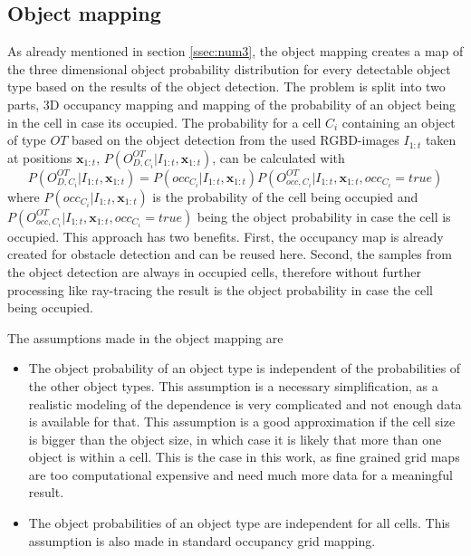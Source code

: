 \subsection{Object mapping}

As already mentioned in section \ref{ssec:num3}, the object mapping creates a map of the three dimensional object probability distribution for every detectable object type based on the results of the object detection. The problem is split into two parts, 3D occupancy mapping and mapping of the probability of an object being in the cell in case its occupied. The probability for a cell $C_i$ containing an object of type $OT$ based on the object detection from the used RGBD-images $I_{1:t}$ taken at positions $\mathbf{x}_{1:t}$, $P(O_{D,C_{i}}^{OT}|I_{1:t},\mathbf{x}_{1:t})$, can be calculated with
\begin{equation}
 P(O_{D,C_i}^{OT}|I_{1:t},\mathbf{x}_{1:t})=P(occ_{C_i}|I_{1:t},\mathbf{x}_{1:t})P(O_{occ,C_i}^{OT}|I_{1:t}, \mathbf{x}_{1:t},occ_{C_i}=true)
\end{equation}
where $P(occ_{C_i}|I_{1:t},\mathbf{x}_{1:t})$ is the probability of the cell being occupied and $P(O_{occ,C_i}^{OT}|I_{1:t}, \mathbf{x}_{1:t},occ_{C_i}=true)$ being the object probability in case the cell is occupied. This approach has two benefits. First, the occupancy map is already created for obstacle detection and can be reused here. Second, the samples from the object detection are always in occupied cells, therefore without further processing like ray-tracing the result is the object probability in case the cell being occupied.

The assumptions made in the object mapping are
\begin{itemize}
 \item The object probability of an object type is independent of the probabilities of the other object types. This assumption is a necessary simplification, as a realistic modeling of the dependence is very complicated and not enough data is available for that. This assumption is a good approximation if the cell size is bigger than the object size, in which case it is likely that more than one object is within a cell. This is the case in this work, as fine grained grid maps are too computational expensive and need much more data for a meaningful result.
 \item The object probabilities of an object type are independent for all cells. This assumption is also made in standard occupancy grid mapping. 
\end{itemize}

